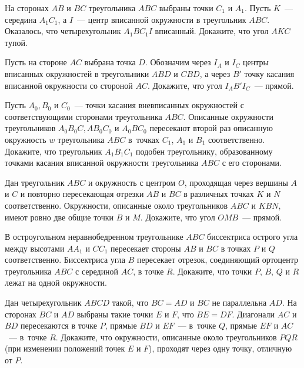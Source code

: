 \begin{problems}

\item
На сторонах $AB$ и $BC$ треугольника $ABC$ выбраны точки $C_1$ и $A_1$.
Пусть $K$~--- середина $A_1 C_1$, а $I$~--- центр вписанной окружности в
треугольник $ABC$.
Оказалось, что четырехугольник $A_1 B C_1 I$ вписанный.
Докажите, что угол $AKC$ тупой.

\item
Пусть на стороне $AC$ выбрана точка $D$.
Обозначим через $I_A$ и $I_C$ центры вписанных окружностей в треугольники
$ABD$ и $CBD$, а через $B'$ точку касания вписанной окружности со
стороной $AC$.
Докажите, что угол $I_A B' I_C$~--- прямой.

\item
Пусть $A_0, B_0$ и $C_0$~--- точки касания вневписанных окружностей с
соответствующими сторонами треугольника $ABC$.
Описанные окружности треугольников $A_0 B_0 C, A B_0 C_0$ и $A_0 B C_0$
пересекают второй раз описанную окружность $w$ треугольника $ABC$ в~точках
$C_1$, $A_1$ и $B_1$ соответственно.
Докажите, что треугольник $A_1 B_1 C_1$ подобен треугольнику, образованному
точками касания вписанной окружности треугольника $ABC$ с его сторонами.

\item
Дан треугольник $ABC$ и окружность с центром $O$, проходящая через вершины $A$
и $C$ и повторно пересекающая отрезки $AB$ и $BC$ в различных точках $K$ и $N$
соответственно.
Окружности, описанные около треугольников $ABC$ и $KBN$, имеют ровно две общие
точки $B$ и $M$.
Докажите, что угол $OMB$~--- прямой.

\item
В остроугольном неравнобедренном треугольнике $ABC$ биссектриса острого угла
между высотами $A A_1$ и $C C_1$ пересекает стороны $AB$ и $BC$ в точках $P$ и
$Q$ соответственно.
Биссектриса угла $B$ пересекает отрезок, соединяющий ортоцентр треугольника
$ABC$ с серединой $AC$, в точке $R$.
Докажите, что точки $P$, $B$, $Q$ и $R$ лежат на одной окружности.

\item
Дан четырехугольник $ABCD$ такой, что $BC = AD$ и $BC$ не параллельна $AD$.
На сторонах $BC$ и $AD$ выбраны такие точки $E$ и $F$, что $BE = DF$.
Диагонали $AC$ и $BD$ пересекаются в точке $P$, прямые $BD$ и $EF$~--- в~точке
$Q$, прямые $EF$ и $AC$~--- в~точке $R$.
Докажите, что окружности, описанные около треугольников $PQR$ (при изменении
положений точек $E$ и $F$), проходят через одну точку, отличную от $P$.

\end{problems}

\endgroup%


